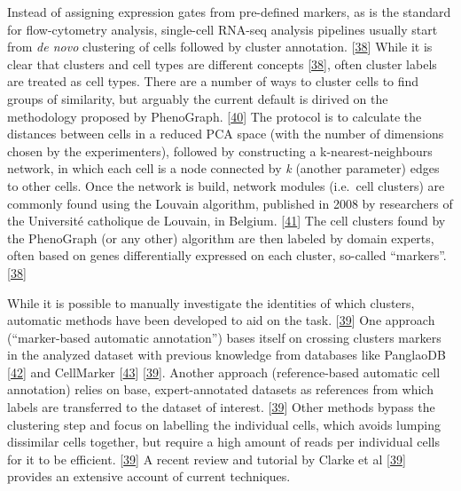 Instead of assigning expression gates from pre-defined markers, as is the standard for flow-cytometry analysis, single-cell RNA-seq analysis pipelines usually start from \emph{de novo} clustering of cells followed by cluster annotation. {[}\protect\hyperlink{ref-WKbly37M}{38}{]}
While it is clear that clusters and cell types are different concepts {[}\protect\hyperlink{ref-WKbly37M}{38}{]}, often cluster labels are treated as cell types.
There are a number of ways to cluster cells to find groups of similarity, but arguably the current default is dirived on the methodology proposed by PhenoGraph. {[}\protect\hyperlink{ref-pEJYKNFc}{40}{]}
The protocol is to calculate the distances between cells in a reduced PCA space (with the number of dimensions chosen by the experimenters), followed by constructing a k-nearest-neighbours network, in which each cell is a node connected by \emph{k} (another parameter) edges to other cells.
Once the network is build, network modules (i.e.~cell clusters) are commonly found using the Louvain algorithm, published in 2008 by researchers of the Université catholique de Louvain, in Belgium. {[}\protect\hyperlink{ref-JpCsfe9G}{41}{]}
The cell clusters found by the PhenoGraph (or any other) algorithm are then labeled by domain experts, often based on genes differentially expressed on each cluster, so-called ``markers''. {[}\protect\hyperlink{ref-WKbly37M}{38}{]}

While it is possible to manually investigate the identities of which clusters, automatic methods have been developed to aid on the task. {[}\protect\hyperlink{ref-ii1dVqoy}{39}{]}
One approach (``marker-based automatic annotation'') bases itself on crossing clusters markers in the analyzed dataset with previous knowledge from databases like PanglaoDB {[}\protect\hyperlink{ref-1GezH4XNn}{42}{]} and CellMarker {[}\protect\hyperlink{ref-chGii6yw}{43}{]} {[}\protect\hyperlink{ref-ii1dVqoy}{39}{]}.
Another approach (reference-based automatic cell annotation) relies on base, expert-annotated datasets as references from which labels are transferred to the dataset of interest. {[}\protect\hyperlink{ref-ii1dVqoy}{39}{]}
Other methods bypass the clustering step and focus on labelling the individual cells, which avoids lumping dissimilar cells together, but require a high amount of reads per individual cells for it to be efficient. {[}\protect\hyperlink{ref-ii1dVqoy}{39}{]}
A recent review and tutorial by Clarke et al {[}\protect\hyperlink{ref-ii1dVqoy}{39}{]} provides an extensive account of current techniques.

